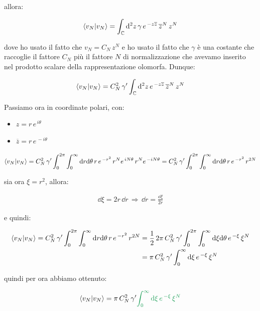 	allora:
	
\begin{align*}
	\braket{v_N}{v_N} = \int_{\mathbb{C}} \dd^2 z \, \gamma \, e^{\, - z \overline{z}} \, \overline{z}^{N} \, z^N
\end{align*}
	
	dove ho usato il fatto che $v_N = C_N \, z^N$ e ho usato il fatto che $\gamma$ è una costante che raccoglie il fattore $C_N$ più il fattore $N$ di normalizzazione che avevamo inserito nel prodotto scalare della rappresentazione olomorfa. Dunque:
	
\begin{align*}
	\braket{v_N}{v_N} = C^2_N \, \gamma' \int_{\mathbb{C}} \dd^2 z \, e^{\, -z \overline{z}} \, \overline{z}^N \, z^N
\end{align*}

	Passiamo ora in coordinate polari, con:
	
\begin{itemize}
	\item $z = r \, e^{ \, i \theta}$
	\item $\overline{z} = r \, e^{ \,- i\theta}$
\end{itemize}

\begin{align*}
	\braket{v_N}{v_N} = C^2_N \, \gamma' \int_0^{2\pi}\int_0^{\infty} \dd r \dd \theta \, r \, e^{\, -r^2} \, r^N e^{\, iN\theta} \, r^N e^{\, - iN\theta} = C_N^2 \, \gamma' \int_0^{2\pi}\int_0^{\infty} \dd r \dd \theta \, r \, e^{\, -r^2} \, r^{2N}
\end{align*}

	sia ora $\xi = r^2$, allora:
	
\begin{align*}
	\dd \xi = 2 r \, \dd r \, \Rightarrow \, \dd r = \frac{\dd \xi}{2 r }
\end{align*}
	
	e quindi:
	
\begin{align*}
	\braket{v_N}{v_N} = C_N^2 \, \gamma' \int_0^{2\pi}\int_0^{\infty} \dd r \dd \theta \, r \, e^{\, -r^2} \, r^{2N} &= \frac{1}{2} \, 2\pi \, C_N^2 \, \gamma' \int_0^{2\pi}\int_0^{\infty} \dd \xi \dd \theta  \, e^{\, -\xi} \, \xi^{N} \\
	&= \pi \, C_N^2 \, \gamma' \int_0^{\infty} \dd \xi \, e^{\, -\xi} \, \xi^{N}
\end{align*}

	quindi per ora abbiamo ottenuto:

\begin{nb}
\begin{align*}
	\braket{v_N}{v_N} = \pi \, C_N^2 \, \gamma' \textcolor{ForestGreen}{\int_0^{\infty} \dd \xi \, e^{\, -\xi} \, \xi^{N}}
\end{align*}
\end{nb}

